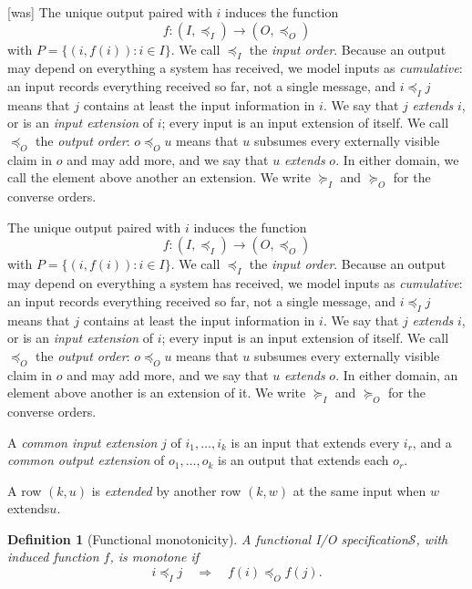 \documentclass[sigconf]{cidr-2027}
\newtheorem{definition}{Definition}
\theoremstyle{remark}
\newcommand{\InputOrd}{\preceq_I}
\newcommand{\OutputOrd}{\preceq_O}
\newcommand{\InputGe}{\succeq_I}
\newcommand{\OutputGe}{\succeq_O}
\newcommand{\inrel}{extends\xspace}          %
\newcommand{\indesc}{input extension\xspace} %
\newcommand{\outrel}{extends\xspace}          %
\newcommand{\outrelpast}{extended\xspace}     %
\newcommand{\outnoun}{output extension\xspace}%
\newcommand{\Spec}{\mathcal{S}}
\newcommand{\spectype}[1][]{I/O specification#1\xspace}
\begin{document}
{\footnotesize\color{black!50}\noindent\textsf{[was]} The unique output paired with $i$ induces the function
\[f:(I,\InputOrd)\to(O,\OutputOrd)\]
with $P=\{(i,f(i)):i\in I\}.$
We call
$\InputOrd$ the \emph{input order}.  Because an output may depend on everything
a system has received, we model inputs as \emph{cumulative}: an input
records everything received so far, not a single message, and $i\InputOrd j$
means that $j$ contains at least the input information in $i$.  We say that $j$
\emph{\inrel} $i$, or is an \emph{\indesc} of $i$; every input is an \indesc of itself. We call $\OutputOrd$ the
\emph{output order}: $o\OutputOrd u$ means that $u$ subsumes every
externally visible claim in $o$ and may add more, and we say that $u$
\emph{\outrel} $o$.  In either domain, we call the element above another
an extension.  We write $\InputGe$ and $\OutputGe$ for the converse orders.\par}

\color{blue!70!black}The unique output paired with $i$ induces the function
\[f:(I,\InputOrd)\to(O,\OutputOrd)\]
with $P=\{(i,f(i)):i\in I\}.$
We call
$\InputOrd$ the \emph{input order}.  Because an output may depend on everything
a system has received, we model inputs as \emph{cumulative}: an input
records everything received so far, not a single message, and $i\InputOrd j$
means that $j$ contains at least the input information in $i$.  We say that $j$
\emph{\inrel} $i$, or is an \emph{\indesc} of $i$; every input is an \indesc of itself. We call $\OutputOrd$ the
\emph{output order}: $o\OutputOrd u$ means that $u$ subsumes every
externally visible claim in $o$ and may add more, and we say that $u$
\emph{\outrel} $o$.  In either domain, an element above another is an extension of it.  We write $\InputGe$ and $\OutputGe$ for the converse orders.\color{black}

A \emph{common \indesc} $j$ of
$i_1,\ldots,i_k$ is an input that \inrel every $i_r$, and a
\emph{common \outnoun} of $o_1,\ldots,o_k$ is an output that \outrel each $o_r$.

A row $(k,u)$ is \emph{\outrelpast} by another row $(k,w)$ at the same input
when $w$ \outrel $u$.

\begin{definition}[Functional monotonicity]
\label{def:functional-monotonicity}
A functional \spectype $\Spec$, with induced function $f$, is
\emph{monotone} if
\begin{equation}
  i\InputOrd j
  \quad\Longrightarrow\quad
  f(i)\OutputOrd f(j).
  \label{eq:functional-monotonicity}
\end{equation}
\end{definition}
\end{document}
